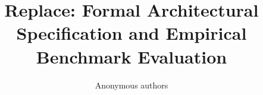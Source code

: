 \title{\textbf{Replace: Formal Architectural Specification and Empirical Benchmark Evaluation}}

\author{Anonymous authors}
